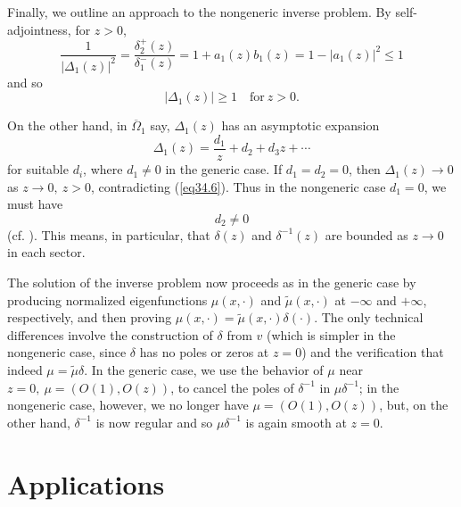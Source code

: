 \documentclass{surv-l}
\theoremstyle{plain}
\theoremstyle{definition}
\numberwithin{equation}{chapter}
\begin{document}
Finally, we outline an approach to the nongeneric inverse problem. By self-adjointness, for $z>0$,
\begin{equation*}
\frac{1}{|\Delta_{1}(z)|^{2}}=\frac{\delta_{2}^{+}(z)}{\delta_{1}^{-}(z)}=1+a_{1}(z)b_{1}(z)=1-|a_{1}(z)|^{2}\leq 1
\end{equation*}
and so
\setcounter{equation}{5}
\begin{equation}\label{eq34.6a}
|\Delta_{1}(z)|\geq 1\quad \mathrm{for}\ z>0.
\end{equation}

On the other hand, in $\overline{\Omega}_{1}$ say, $\Delta_{1}(z)$ has an asymptotic expansion
\begin{equation*}
\Delta_{1}(z)=\frac{d_{1}}{z}+d_{2}+d_{3}z+ \cdots
\end{equation*}
for suitable $d_{i}$, where $d_{1}\neq 0$ in the generic case. If $d_{1}=d_{2}=0$, then $\Delta_{1}(z)\rightarrow 0$ as $z\rightarrow 0,\ z>0$, contradicting (\ref{eq34.6}). Thus in the nongeneric case $d_{1}=0$, we must have
\begin{equation}\label{eq34.7}
d_{2}\neq 0
\end{equation}
(cf. \cite{DT}). This means, in particular, that $\delta(z)$ and $\delta^{-1}(z)$ are bounded as $z\rightarrow 0$ in each sector.

The solution of the inverse problem now proceeds as in the generic case by producing normalized eigenfunctions $\mu(x, \cdot)$ and $\tilde{\mu}(x, \cdot)$ at $-\infty$ and $+\infty$, respectively, and then proving $\mu(x, \cdot)=\tilde{\mu}(x, \cdot)\delta(\cdot)$. The only technical differences involve the construction of $\delta$ from $v$ (which is simpler in the nongeneric case, since $\delta$ has no poles or zeros at $z=0$) and the verification that indeed $\mu=\tilde{\mu}\delta$. In the generic case, we use the behavior of $\mu$ near $z=0,\ \mu=(O(1), O(z))$, to cancel the poles of $\delta^{-1}$ in $\mu\delta^{-1}$; in the nongeneric case, however, we no longer have $\mu=(O(1),O(z))$, but, on the other hand, $\delta^{-1}$ is now regular and so $\mu\delta^{-1}$ is again smooth at $z=0$.

\part{Applications}
\end{document}
